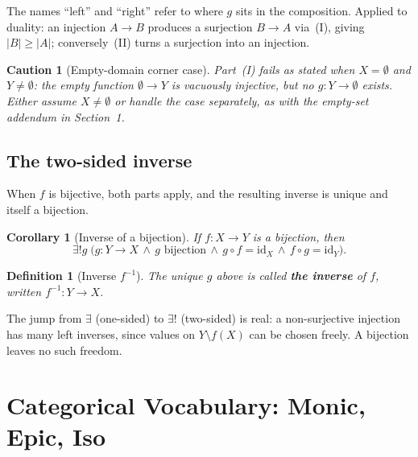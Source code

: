 \documentclass[11pt]{article}
\theoremstyle{defstyle}
\newtheorem{definition}{Definition}[section]
\theoremstyle{thmstyle}
\newtheorem{corollary}[theorem]{Corollary}
\theoremstyle{notstyle}
\theoremstyle{cautionstyle}
\newtheorem*{caution}{Caution}
\newcommand{\card}[1]{\lvert #1 \rvert}
\begin{document}
The names ``left'' and ``right'' refer to where $g$ sits in the composition.
Applied to duality: an injection $A \to B$ produces a surjection $B \to A$
via~(I), giving $\card{B} \geq \card{A}$; conversely~(II) turns a surjection
into an injection.

\begin{cautionbox}
\begin{caution}[Empty-domain corner case]
Part~(I) fails as stated when $X = \emptyset$ and $Y \neq \emptyset$: the
empty function $\emptyset \to Y$ is vacuously injective, but no
$g : Y \to \emptyset$ exists. Either assume $X \neq \emptyset$ or handle the
case separately, as with the empty-set addendum in Section~1.
\end{caution}
\end{cautionbox}

\subsection*{The two-sided inverse}

When $f$ is bijective, both parts apply, and the resulting inverse is unique
and itself a bijection.

\begin{thmbox}
\begin{corollary}[Inverse of a bijection]
If $f : X \to Y$ is a bijection, then
\[
  \exists ! g \;\bigl( g : Y \to X
    \,\land\, g \text{ bijection}
    \,\land\, g \circ f = \mathrm{id}_X
    \,\land\, f \circ g = \mathrm{id}_Y \bigr).
\]
\end{corollary}
\end{thmbox}

\begin{defbox}
\begin{definition}[Inverse $f^{-1}$]
The unique $g$ above is called \textbf{the inverse} of $f$, written
$f^{-1} : Y \to X$.
\end{definition}
\end{defbox}

The jump from $\exists$ (one-sided) to $\exists !$ (two-sided) is real: a
non-surjective injection has many left inverses, since values on $Y \setminus
f(X)$ can be chosen freely. A bijection leaves no such freedom.

\section{Categorical Vocabulary: Monic, Epic, Iso}
\end{document}
